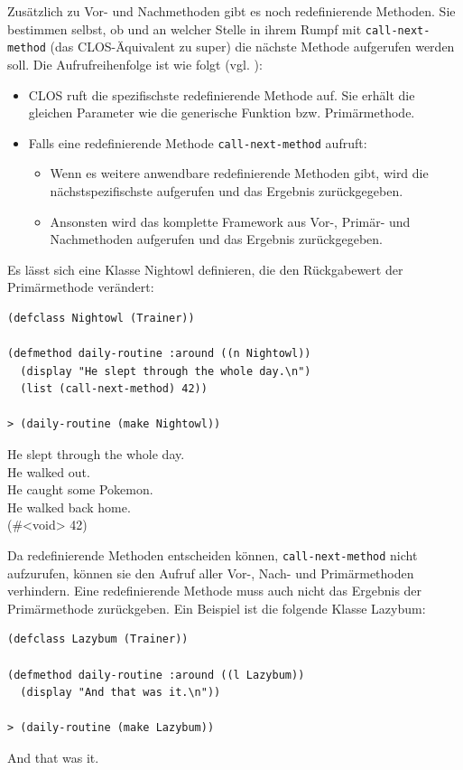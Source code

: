 Zusätzlich zu Vor- und Nachmethoden gibt es noch redefinierende Methoden. Sie bestimmen selbst, ob und an welcher Stelle in ihrem Rumpf mit \texttt{call-next-method} (das CLOS-Äquivalent zu super) die nächste Methode aufgerufen werden soll. Die Aufrufreihenfolge ist wie folgt (vgl. \cite[S.103]{keene}):
\begin{itemize}
 \item CLOS ruft die spezifischste redefinierende Methode auf. Sie erhält die gleichen Parameter wie die generische Funktion bzw. Primärmethode.
 \item Falls eine redefinierende Methode \texttt{call-next-method} aufruft:
 \begin{itemize}
  \item Wenn es weitere anwendbare redefinierende Methoden gibt, wird die nächstspezifischste aufgerufen und das Ergebnis zurückgegeben.
  \item Ansonsten wird das komplette Framework aus Vor-, Primär- und Nachmethoden aufgerufen und das Ergebnis zurückgegeben.
 \end{itemize}
\end{itemize}

Es lässt sich eine Klasse Nightowl definieren, die den Rückgabewert der Primärmethode verändert:

\begin{lstlisting}
(defclass Nightowl (Trainer))

(defmethod daily-routine :around ((n Nightowl))
  (display "He slept through the whole day.\n")
  (list (call-next-method) 42))
  
> (daily-routine (make Nightowl))
\end{lstlisting}
{\routput He slept through the whole day.\\
\phantom{.}He walked out.\\
\phantom{.}He caught some Pokemon.\\
\phantom{.}He walked back home.\\
\phantom{.}(\#<void> 42)}

Da redefinierende Methoden entscheiden können, \texttt{call-next-method} nicht aufzurufen, können sie den Aufruf aller Vor-, Nach- und Primärmethoden verhindern. Eine redefinierende Methode muss auch nicht das Ergebnis der Primärmethode zurückgeben. Ein Beispiel ist die folgende Klasse Lazybum:

\begin{lstlisting}
(defclass Lazybum (Trainer))

(defmethod daily-routine :around ((l Lazybum))
  (display "And that was it.\n"))
  
> (daily-routine (make Lazybum))
\end{lstlisting}
{\routput And that was it.}


